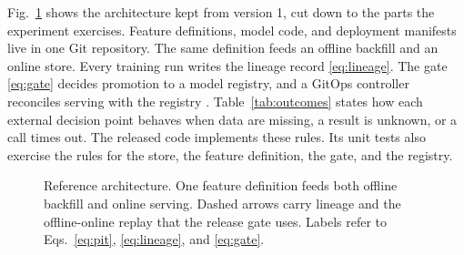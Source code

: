 \documentclass[journal]{IEEEtran}
\begin{document}
Fig.~\ref{fig:arch} shows the architecture kept from version 1, cut down to the parts the experiment exercises. Feature definitions, model code, and deployment manifests live in one Git repository. The same definition feeds an offline backfill and an online store. Every training run writes the lineage record \eqref{eq:lineage}. The gate \eqref{eq:gate} decides promotion to a model registry, and a GitOps controller reconciles serving with the registry \cite{opengitops}. Table~\ref{tab:outcomes} states how each external decision point behaves when data are missing, a result is unknown, or a call times out. The released code implements these rules. Its unit tests also exercise the rules for the store, the feature definition, the gate, and the registry.

\begin{figure}[!t]
\centering
{}
\caption{Reference architecture. One feature definition feeds both offline backfill and online serving. Dashed arrows carry lineage and the offline-online replay that the release gate uses. Labels refer to Eqs.~\eqref{eq:pit}, \eqref{eq:lineage}, and \eqref{eq:gate}.}
\label{fig:arch}
\end{figure}
\end{document}
